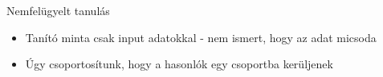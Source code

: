 \begin{frame}{Nemfelügyelt tanulás}
    \begin{itemize}
        \item Tanító minta csak input adatokkal - nem ismert, hogy az adat micsoda
        \item Úgy csoportosítunk, hogy a hasonlók egy csoportba kerüljenek
    \end{itemize}
    
    \centering
\end{frame}
